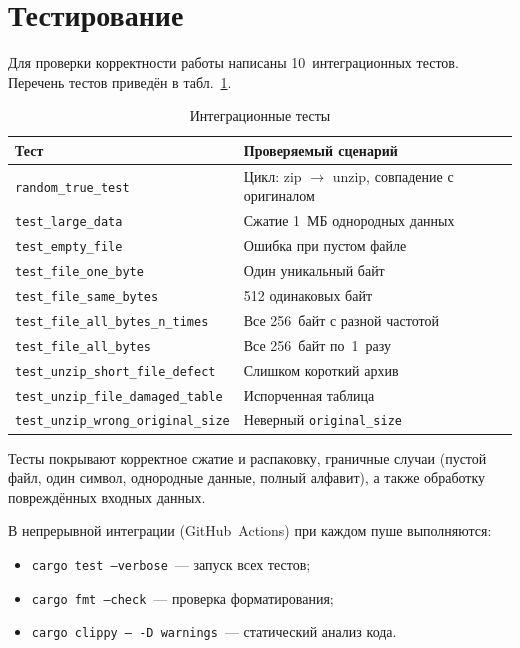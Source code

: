 \documentclass[a4paper]{article}
\begin{document}
\section{Тестирование}

Для проверки корректности работы написаны 10~интеграционных тестов.
Перечень тестов приведён в табл.~\ref{tab:tests}.

\begin{table}[h]
\centering
\caption{Интеграционные тесты}\label{tab:tests} 
\begin{tabular}{ll}
\toprule
\textbf{Тест} & \textbf{Проверяемый сценарий} \\
\midrule
\texttt{random\_true\_test} & Цикл: zip $\to$ unzip, совпадение с оригиналом \\
\texttt{test\_large\_data}  & Сжатие 1~МБ однородных данных \\
\texttt{test\_empty\_file}  & Ошибка при пустом файле \\
\texttt{test\_file\_one\_byte} & Один уникальный байт \\
\texttt{test\_file\_same\_bytes} & 512 одинаковых байт \\
\texttt{test\_file\_all\_bytes\_n\_times} & Все 256~байт с разной частотой \\
\texttt{test\_file\_all\_bytes} & Все 256~байт по~1~разу \\
\texttt{test\_unzip\_short\_file\_defect} & Слишком короткий архив \\
\texttt{test\_unzip\_file\_damaged\_table} & Испорченная таблица \\
\texttt{test\_unzip\_wrong\_original\_size} & Неверный \texttt{original\_size} \\
\bottomrule
\end{tabular}
\end{table}

Тесты покрывают корректное сжатие и распаковку, граничные случаи 
(пустой файл, один символ, однородные данные, полный алфавит), 
а также обработку повреждённых входных данных.

В непрерывной интеграции (GitHub~Actions) при каждом пуше выполняются:
\begin{itemize}
    \item \texttt{cargo test --verbose}~--- запуск всех тестов;
    \item \texttt{cargo fmt --check}~--- проверка форматирования;
    \item \texttt{cargo clippy -- -D warnings}~--- статический анализ кода.
\end{itemize}
\end{document}
